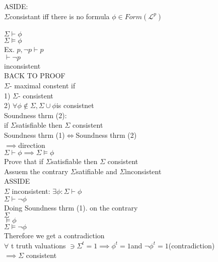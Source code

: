 \documentclass[12pt,oneside,notitlepage]{book}
\theoremstyle{definition}
\newcommand{\Lp}{\mathcal{L}^p}
\begin{document}
ASIDE: \\
$\Sigma$consistant iff there is no formula $\phi \in Form (\Lp) $\\ \\
$\Sigma \vdash \phi$ \\
$\Sigma \vDash \phi $ \\
 
Ex. ${p , \neg p} \vdash p$ \\
			    $ \vdash \neg p$ \\
inconsistent \\
BACK TO PROOF \\
 
$\Sigma $- maximal constent if  \\
1) $\Sigma $- consistent \\
2) $\forall \phi \not \in \Sigma, \Sigma \cup { \phi } $is consistnet \\



Soundness thrm (2): \\
if $\Sigma $satisfiable then $\Sigma$ consistent \\


Soundness thrm (1)$ \iff $Soundness thrm (2) \\


$\implies $direction \\
$\Sigma \vdash \phi \implies \Sigma \vDash \phi$ \\
Prove that if $\Sigma $satisfiable then $\Sigma$ consistent \\
Assuem the contrary $\Sigma $satifiable and $\Sigma $inconsistent \\

ASSIDE \\
$\Sigma$ inconsistent: $\exists \phi : \Sigma \vdash \phi $ \\
$\Sigma \vdash \neg \phi$ \\

Doing Soundness thrm (1). on the contrary \\
$\Sigma$ \\
$ \vDash \phi$ \\
$\Sigma \vDash \neg \phi$ \\
Therefore we get a contradiction \\
$\forall$ t truth valuations $\ni \Sigma ^t = 1 \implies \phi^t = 1 $and $\neg \phi^t = 1 $(contradiction) \\
$\implies  \Sigma$ consistent  \\
\end{document}
